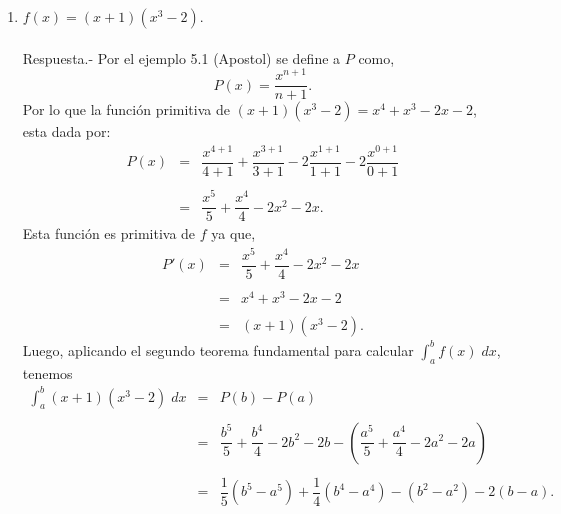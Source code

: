 \begin{enumerate}[\bfseries 1.]
    \item $f(x)=(x+1)(x^3-2).$\\\\
	Respuesta.-\; Por el ejemplo 5.1 (Apostol) se define a $P$ como,
	$$P(x)=\dfrac{x^{n+1}}{n+1}.$$
	Por lo que la función primitiva de $(x+1)(x^3-2)=x^4+x^3-2x-2$, esta dada por:
	$$\begin{array}{rcl}
	    P(x)&=&\dfrac{x^{4+1}}{4+1}+\dfrac{x^{3+1}}{3+1}-2\dfrac{x^{1+1}}{1+1}-2\dfrac{x^{0+1}}{0+1}\\\\
		&=&\dfrac{x^5}{5}+\dfrac{x^4}{4}-2x^2-2x.
	\end{array}$$
	Esta función es primitiva de $f$ ya que,
	$$\begin{array}{rcl}
	    P'(x)&=&\dfrac{x^5}{5}+\dfrac{x^4}{4}-2x^2-2x\\\\
		&=&x^4+x^3-2x-2\\\\
		&=&(x+1)(x^3-2).
	\end{array}$$
	Luego, aplicando el segundo teorema fundamental para calcular $\int_a^b f(x)\; dx$, tenemos
	$$\begin{array}{rcl}
	    \displaystyle\int_a^b (x+1)(x^3-2)\; dx &=&P(b)-P(a)\\\\
					    &=&\dfrac{b^5}{5}+\dfrac{b^4}{4}-2b^2-2b-\left(\dfrac{a^5}{5}+\dfrac{a^4}{4}-2a^2-2a\right)\\\\
					    &=&\dfrac{1}{5}\left(b^5-a^5\right) + \dfrac{1}{4}\left(b^4-a^4\right)-\left(b^2-a^2\right)-2(b-a).
	\end{array}$$
	\vspace{.5cm}


\end{enumerate}
